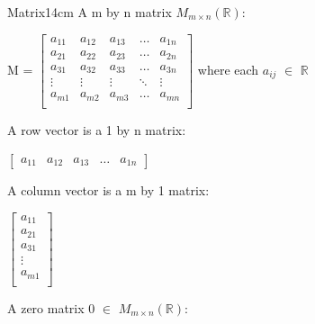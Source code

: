     \begin{definition}{Matrix}{14cm}
        A {\color{lblue} m by n matrix} $M_{m \times n}(\mathbb{R})$:

        \hspace{0.5cm}
        M =
        $
        \begin{bmatrix}
            a_{11} & a_{12} & a_{13} & \hdots & a_{1n} \\
            a_{21} & a_{22} & a_{23} & \hdots & a_{2n} \\
            a_{31} & a_{32} & a_{33} & \hdots & a_{3n} \\
            \vdots & \vdots & \vdots & \ddots & \vdots \\
            a_{m1} & a_{m2} & a_{m3} & \hdots & a_{mn} \\
        \end{bmatrix}
        $
        \hspace{1cm}
        where each $a_{ij}$ $\in$ $\mathbb{R}$

        \vspace{0.3cm}



        A {\color{lblue} row vector} is a 1 by n matrix:

        \hspace{0.5cm}
        $
        \begin{bmatrix}
            a_{11} & a_{12} & a_{13} & \hdots & a_{1n}
        \end{bmatrix}
        $

        \vspace{0.3cm}



        A {\color{lblue} column vector} is a m by 1 matrix:

        \hspace{0.5cm}
        $
        \begin{bmatrix}
            a_{11} \\
            a_{21} \\
            a_{31} \\
            \vdots \\
            a_{m1} \\
        \end{bmatrix}
        $

        \vspace{0.3cm}



        A {\color{lblue} zero matrix} 0 $\in$ $M_{m \times n}(\mathbb{R})$:


\end{definition}
